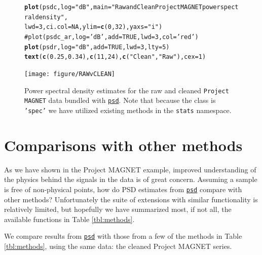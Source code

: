 \documentclass[10pt]{article}\usepackage{graphicx, color}
\makeatletter
\newcommand{\hlfunctioncall}[1]{\textcolor[rgb]{0.501960784313725,0,0.329411764705882}{\textbf{#1}}}%
\newcommand{\hlstring}[1]{\textcolor[rgb]{0.6,0.6,1}{#1}}%
\newcommand{\hlcomment}[1]{\textcolor[rgb]{0.180392156862745,0.6,0.341176470588235}{#1}}%
\newenvironment{kframe}{%
 \def\at@end@of@kframe{}%
 \ifinner\ifhmode%
  \def\at@end@of@kframe{\end{minipage}}%
  \begin{minipage}{\columnwidth}%
 \fi\fi%
 \def\FrameCommand##1{\hskip\@totalleftmargin \hskip-\fboxsep
 \colorbox{shadecolor}{##1}\hskip-\fboxsep
     \hskip-\linewidth \hskip-\@totalleftmargin \hskip\columnwidth}%
 \MakeFramed {\advance\hsize-\width
   \@totalleftmargin\z@ \linewidth\hsize
   \@setminipage}}%
 {\par\unskip\endMakeFramed%
 \at@end@of@kframe}
\newenvironment{knitrout}{}{} %
\newcommand{\Rcmd}[1]{\texttt{#1}}
\newcommand{\psd}[0]{\href{http://abarbour.github.com/psd/}{\color{blue}\Rcmd{psd}}}
\makeatother
\begin{document}
%
\begin{figure}[htb!]
\begin{center}
\begin{knitrout}
\color{fgcolor}\begin{kframe}
\begin{alltt}
\hlfunctioncall{plot}(psdc, log = \hlstring{"dB"}, main = \hlstring{"Raw and Clean Project MAGNET power spectral density"}, 
    lwd = 3, ci.col = NA, ylim = \hlfunctioncall{c}(0, 32), yaxs = \hlstring{"i"})
\hlcomment{# plot(psdc_ar, log='dB', add=TRUE, lwd=3, col='red')}
\hlfunctioncall{plot}(psdr, log = \hlstring{"dB"}, add = TRUE, lwd = 3, lty = 5)
\hlfunctioncall{text}(\hlfunctioncall{c}(0.25, 0.34), \hlfunctioncall{c}(11, 24), \hlfunctioncall{c}(\hlstring{"Clean"}, \hlstring{"Raw"}), cex = 1)
\end{alltt}
\end{kframe}
\texttt{[image: figure/RAWvCLEAN]} 

\end{knitrout}

\caption{Power spectral density estimates for the raw and cleaned
             \Rcmd{Project MAGNET} data bundled with \psd{}. Note that
             because the class is \Rcmd{'spec'} we have
             utilized  existing methods in the \Rcmd{stats} namespace.}
\label{fig:pmag}
\end{center}
\end{figure}

\section{Comparisons with other methods}

As we have shown in the Project MAGNET example, 
improved understanding of the physics behind the signals in the data
is of great concern.
Assuming a sample is free of non-physical points, how do
PSD estimates from \psd{}
compare with other methods?
Unfortunately the suite of extensions with similar functionality
is relatively limited, but hopefully we have
summarized most, if not all, the available functions in Table \ref{tbl:methods}.



We compare results from
\psd{} with those from a few of the methods in Table \ref{tbl:methods},
using the same data: the cleaned Project MAGNET series.
\end{document}
